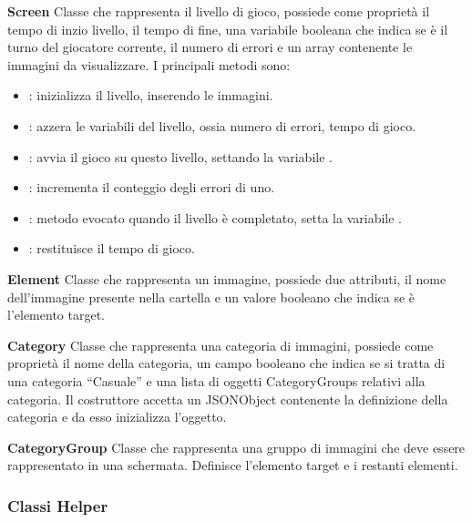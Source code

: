 \begin{description}
\item \textbf{Screen}
Classe che rappresenta il livello di gioco, possiede come propriet\`{a} il tempo di inzio livello, il tempo di fine, una variabile booleana che indica se \`{e} il turno del giocatore corrente, il numero di errori e un array contenente le immagini da visualizzare. I principali metodi sono:
\begin{itemize}
\item {}: inizializza il livello, inserendo le immagini.
\item {}: azzera le variabili del livello, ossia numero di errori, tempo di gioco.
\item {}: avvia il gioco su questo livello, settando la variabile .
\item {}: incrementa il conteggio degli errori di uno.
\item {}: metodo evocato quando il livello \`{e} completato, setta la variabile .
\item {}: restituisce il tempo di gioco.
\end{itemize}
\item \textbf{Element}
\noindent Classe che rappresenta un immagine, possiede due attributi, il nome dell'immagine presente nella cartella  e un valore booleano che indica se \`{e} l'elemento target.
\item \textbf{Category}
Classe che rappresenta una categoria di immagini, possiede come propriet\`{a} il nome della categoria, un campo booleano che indica se si tratta di una categoria ``Casuale'' e una lista di oggetti CategoryGroups relativi alla categoria. Il costruttore accetta un JSONObject contenente la definizione della categoria e da esso inizializza l'oggetto.
\item \textbf{CategoryGroup}
Classe che rappresenta una gruppo di immagini che deve essere rappresentato in una schermata. Definisce l'elemento target e i restanti elementi.
\end{description}

\subsubsection{Classi Helper}


